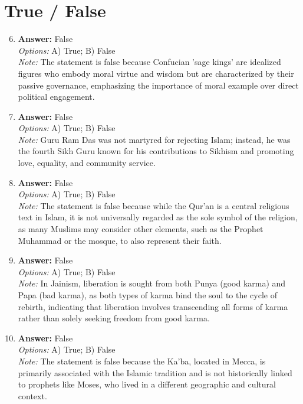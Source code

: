 \documentclass[12pt]{article}
\begin{document}
\section*{True / False}
\begin{enumerate}[label=\arabic*.]
\setcounter{enumi}{5}
\item \textbf{Answer:} False
\\ \textit{Options:} A) True; B) False
\\ \textit{Note:} The statement is false because Confucian 'sage kings' are idealized figures who embody moral virtue and wisdom but are characterized by their passive governance, emphasizing the importance of moral example over direct political engagement.
\item \textbf{Answer:} False
\\ \textit{Options:} A) True; B) False
\\ \textit{Note:} Guru Ram Das was not martyred for rejecting Islam; instead, he was the fourth Sikh Guru known for his contributions to Sikhism and promoting love, equality, and community service.
\item \textbf{Answer:} False
\\ \textit{Options:} A) True; B) False
\\ \textit{Note:} The statement is false because while the Qur'an is a central religious text in Islam, it is not universally regarded as the sole symbol of the religion, as many Muslims may consider other elements, such as the Prophet Muhammad or the mosque, to also represent their faith.
\item \textbf{Answer:} False
\\ \textit{Options:} A) True; B) False
\\ \textit{Note:} In Jainism, liberation is sought from both Punya (good karma) and Papa (bad karma), as both types of karma bind the soul to the cycle of rebirth, indicating that liberation involves transcending all forms of karma rather than solely seeking freedom from good karma.
\item \textbf{Answer:} False
\\ \textit{Options:} A) True; B) False
\\ \textit{Note:} The statement is false because the Ka'ba, located in Mecca, is primarily associated with the Islamic tradition and is not historically linked to prophets like Moses, who lived in a different geographic and cultural context.
\end{enumerate}
\end{document}
